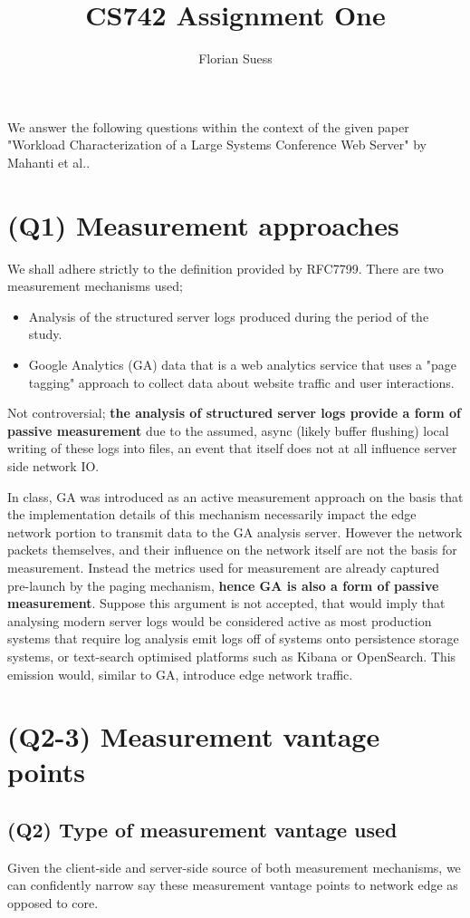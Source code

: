 \documentclass{article}
\title{CS742 Assignment One}
\author{Florian Suess}
\begin{document}
\maketitle
We answer the following questions within the context of the given paper "Workload Characterization of a Large Systems Conference Web Server" by Mahanti et al.\cite{mahanti2009}.
\section*{(Q1) Measurement approaches}
We shall adhere strictly to the definition provided by RFC7799\cite{rfc7799}. There are two measurement mechanisms used;

\begin{itemize}
				\item Analysis of the structured server logs produced during the period of the study.
				\item Google Analytics (GA) data that is a web analytics service that uses a "page tagging" approach to collect data about website traffic and user interactions.
\end{itemize}

Not controversial; \textbf{the analysis of structured server logs provide a form of passive measurement} due to the assumed, async (likely buffer flushing) local writing of these logs into files, an event that itself does not at all influence server side network IO.

In class, GA was introduced as an active measurement approach on the basis that the implementation details of this mechanism necessarily impact the edge network portion to transmit data to the GA analysis server. However the network packets themselves, and their influence on the network itself are not the basis for measurement. Instead the metrics used for measurement are already captured pre-launch by the paging mechanism, \textbf{hence GA is also a form of passive measurement}. Suppose this argument is not accepted, that would imply that analysing modern server logs would be considered active as most production systems that require log analysis emit logs off of systems onto persistence storage systems, or text-search optimised platforms such as Kibana or OpenSearch. This emission would, similar to GA, introduce edge network traffic.

\section*{(Q2-3) Measurement vantage points}
\subsection*{(Q2) Type of measurement vantage used}
Given the client-side and server-side source of both measurement mechanisms, we can confidently narrow say these measurement vantage points to network edge as opposed to core.
\end{document}
